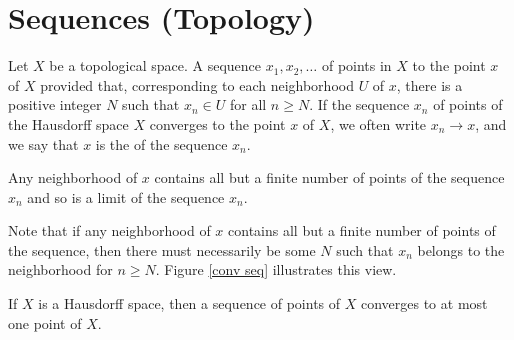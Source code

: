 \newpage

\section{Sequences (Topology)}

\begin{definition}
	Let $X$ be a topological space. A sequence $x_1, x_2, \dots$ of 
	points in $X$  to the point $x$ of $X$ provided that, 
	corresponding to each neighborhood $U$ of $x$, there is a 
	positive integer $N$ such that $x_n \in U$ for all $n \geq 
	N$. If the sequence $x_n$ of points of the Hausdorff space 
	$X$ converges to the point $x$ of $X$, we often write $x_n 
	\to x$, and we say that $x$ is the 
	 of the sequence 
	$x_n$.
\end{definition}

\begin{marginfigure}
	\centering
	\caption{Any neighborhood of $x$ contains all but a finite 
	number of points of the sequence $x_n$ and so is a limit of the 
	sequence $x_n$.}\label{conv seq}
\end{marginfigure}

Note that if any neighborhood of $x$ contains all but a finite 
number of points of the sequence, then there must necessarily be 
some $N$ such that $x_n$ belongs to the neighborhood for $n \geq 
N$. Figure \ref{conv seq} illustrates this view.

\begin{theorem}
	If $X$ is a Hausdorff space, then a sequence of points of $X$ 
	converges to at most one point of $X$.
\end{theorem}


